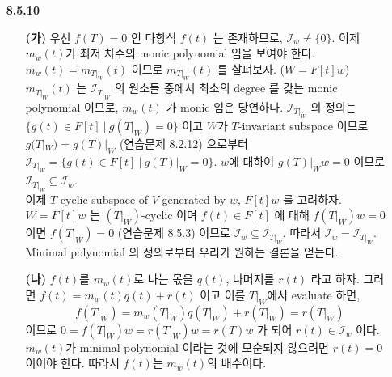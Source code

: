 \documentclass[12pt]{report}
\begin{document}
\begin{itemize}
\item[\textbf{8.5.10}] 
	\begin{itemize}
		\item[\textbf{(가)}] 우선 $f(T)=0$ 인 다항식 $f(t)$ 는 존재하므로, $\mathcal{I}_w \neq \{0\}$. 이제 $m_w(t)$가 최저 차수의 monic polynomial 임을 보여야 한다. $m_w(t) = m_{T|_W}(t)$ 이므로  $m_{T|_W}(t)$ 를 살펴보자. ($W = F[t]w$) $m_{T|_W}(t)$ 는 $\mathcal{I}_{T|_W}$ 의 원소들 중에서 최소의 degree 를 갖는 monic polynomial 이므로, $m_w(t)$ 가 monic 임은 당연하다. $\mathcal{I}_{T|_W}$ 의 정의는 $\{g(t)\in F[t] \: | \:g(T|_W) = 0\}$ 이고 $W$가 $T$-invariant subspace 이므로 $g(T|_W) = g(T)|_W$ (연습문제 8.2.12) 으로부터 $\mathcal{I}_{T|_W} = \{g(t)\in F[t] \: | \:g(T)|_W = 0\}$. $w$에 대하여 $g(T)|_Ww = 0$ 이므로 $\mathcal{I}_{T|_W} \subseteq \mathcal{I}_w$. \\이제 $T$-cyclic subspace of $V$ generated by $w$, $F[t]w$ 를 고려하자. $W=F[t]w$ 는 $(T|_W)$-cyclic 이며 $f(t)\in F[t]$ 에 대해 $f(T|_W)w=0$ 이면 $f(T|_W)=0$ (연습문제 8.5.3) 이므로 $\mathcal{I}_w \subseteq  \mathcal{I}_{T|_W}$. 따라서 $\mathcal{I}_w = \mathcal{I}_{T|_W}$. Minimal polynomial 의 정의로부터 우리가 원하는 결론을 얻는다.  
		\item[\textbf{(나)}] $f(t)$를 $m_w(t)$로 나는 몫을 $q(t)$, 나머지를 $r(t)$ 라고 하자. 그러면 $f(t)=m_w(t)q(t) + r(t)$ 이고 이를 $T|_W$에서 evaluate 하면, $$f(T|_W)=m_w(T|_W)q(T|_W)+r(T|_W) = r(T|_W)$$ 이므로 $0 = f(T|_W)w = r(T|_W)w = r(T)w$ 가 되어 $r(t)\in \mathcal{I}_w$ 이다. $m_w(t)$가 minimal polynomial 이라는 것에 모순되지 않으려면 $r(t) = 0$ 이어야 한다. 따라서 $f(t)$는 $m_w(t)$의 배수이다.
	\end{itemize}


\end{itemize}
\end{document}
